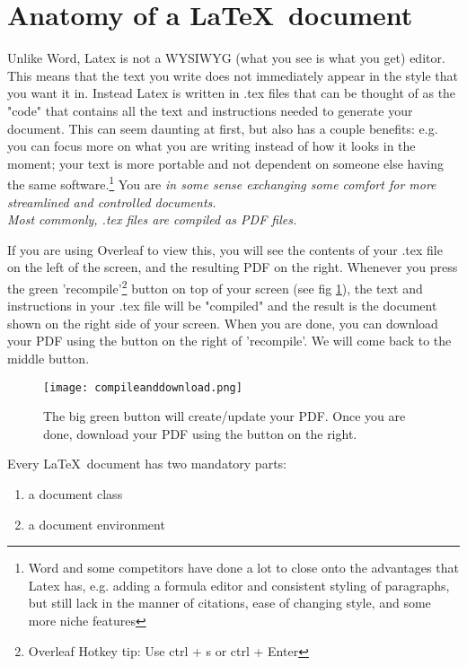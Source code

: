 \section{Anatomy of a \LaTeX~document}

Unlike Word, Latex is not a WYSIWYG (what you see is what you get) editor. This means that the text you write does not immediately appear in the style that you want it in. Instead Latex is written in .tex files that can be thought of as the "code" that contains all the text and instructions needed to generate your document. This can seem daunting at first, but also has a couple benefits: e.g. you can focus more on what you are writing instead of how it looks in the moment; your text is more portable and not dependent on someone else having the same software.\footnote{Word and some competitors have done a lot to close onto the advantages that Latex has, e.g. adding a formula editor and consistent styling of paragraphs, but still lack in the manner of citations, ease of changing style, and some more niche features} You are \em in some sense \em exchanging some comfort for more streamlined and controlled documents.\\
Most commonly, .tex files are compiled as PDF files. 

If you are using Overleaf to view this, you will see the contents of your .tex file on the left of the screen, and the resulting PDF on the right. Whenever you press the green 'recompile'\footnote{Overleaf Hotkey tip: Use ctrl + s or ctrl + Enter} button on top of your screen (see fig \ref{fig:recompile}), the text and instructions in your .tex file will be "compiled" and the result is the document shown on the right side of your screen. When you are done, you can download your PDF using the button on the right of 'recompile'. We will come back to the middle button.

\begin{figure}[ht!]
    \centering
    \texttt{[image: compileanddownload.png]}
    \caption{The big green button will create/update your PDF. Once you are done, download your PDF using the button on the right.}
    \label{fig:recompile}
\end{figure}

\noindent Every \LaTeX~document has two mandatory parts:

\begin{enumerate}
    \item a document class
    \item a document environment 
\end{enumerate}


